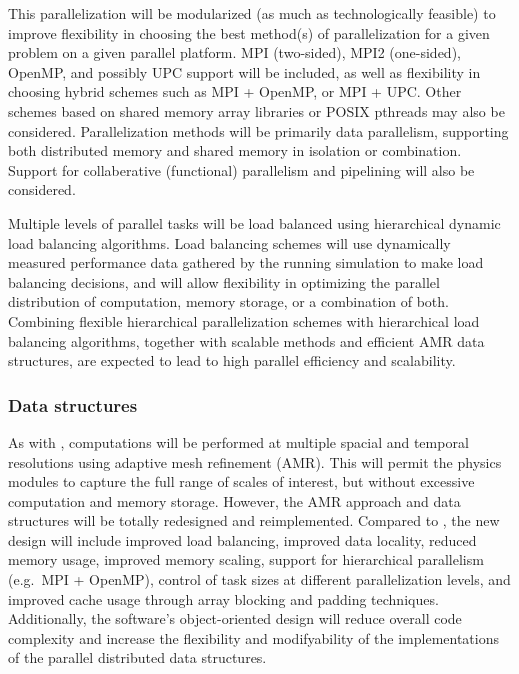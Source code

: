 \documentclass[11pt]{article}
\begin{document}
    This parallelization will be modularized (as much as
    technologically feasible) to improve flexibility in choosing the
    best method(s) of parallelization for a given problem on a given
    parallel platform.  MPI (two-sided), MPI2 (one-sided), OpenMP, and
    possibly UPC support will be included, as well as flexibility in
    choosing hybrid schemes such as MPI + OpenMP, or MPI + UPC.  Other
    schemes based on shared memory array libraries or POSIX pthreads
    may also be considered.  Parallelization methods will be primarily
    data parallelism, supporting both distributed memory and shared
    memory in isolation or combination.  Support for collaberative
    (functional) parallelism and pipelining will also be considered.


    Multiple levels of parallel tasks will be load balanced using
    hierarchical dynamic load balancing algorithms.  Load balancing
    schemes will use dynamically measured performance data gathered by
    the running simulation to make load balancing decisions, and will
    allow flexibility in optimizing the parallel distribution of
    computation, memory storage, or a combination of both.  Combining
    flexible hierarchical parallelization schemes with hierarchical
    load balancing algorithms, together with scalable methods and
    efficient AMR data structures, are expected to lead to high
    parallel efficiency and scalability.


    \subsubsection{Data structures}

    
    As with \enzo, computations will be performed at multiple spacial
    and temporal resolutions using adaptive mesh refinement (AMR).
    This will permit the physics modules to capture the full range of
    scales of interest, but without excessive computation and memory
    storage.  However, the AMR approach and data structures will be
    totally redesigned and reimplemented.  Compared to \enzo, the new
    design will include improved load balancing, improved data
    locality, reduced memory usage, improved memory scaling, support
    for hierarchical parallelism (e.g.~MPI + OpenMP), control of task
    sizes at different parallelization levels, and improved cache
    usage through array blocking and padding techniques.
    Additionally, the software's object-oriented design will reduce
    overall code complexity and increase the flexibility and
    modifyability of the implementations of the parallel distributed
    data structures.
\end{document}
